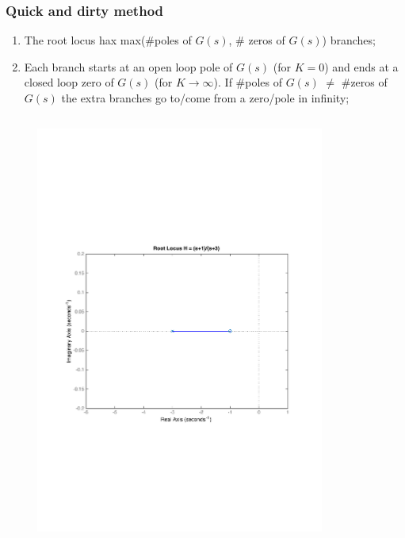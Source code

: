 \begin{frame}
\frametitle{Quick and dirty method}
	\begin{enumerate}
		\item The root locus hax max($\#$poles of $G(s)$, $\#$ zeros of $G(s)$) branches;
		\item Each branch starts at an open loop pole of $G(s)$ (for $K=0$) and ends at a closed loop zero of $G(s)$ (for $K \rightarrow \infty$). If $\#$poles of $G(s)$ $\neq$ $\#$zeros of $G(s)$ the extra branches go to/come from a zero/pole in infinity;
	\end{enumerate}
	\vspace{-1em}
	\begin{columns}
		\begin{column}{0.5\textwidth}
			\begin{figure}
				\centering
				\includegraphics[width=0.8\linewidth]{how_to_draw_easy_ex1}
			\end{figure}
		\end{column}
		\begin{column}{0.5\textwidth}
			\begin{figure}
				\centering

\end{figure}
\end{column}
\end{columns}
\end{frame}
